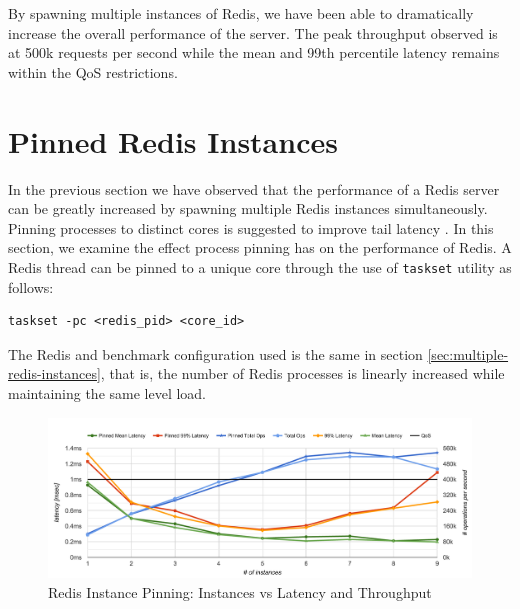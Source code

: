 By spawning multiple instances of Redis, we have been able to dramatically increase the overall performance of the server. The peak throughput observed is at 500k requests per second while the mean and 99th percentile latency remains within the QoS restrictions.


\section{Pinned Redis Instances}

In the previous section we have observed that the performance of a Redis server can be greatly increased by spawning multiple Redis instances simultaneously. Pinning processes to distinct cores is suggested to improve tail latency \cite{leverich2014reconciling}. In this section, we examine the effect process pinning has on the performance of Redis. A Redis thread can be pinned to a unique core through the use of \texttt{taskset} utility as follows:

\begin{lstlisting}
taskset -pc <redis_pid> <core_id>
\end{lstlisting}

The Redis and benchmark configuration used is the same in section \ref{sec:multiple-redis-instances}, that is, the number of Redis processes is linearly increased while maintaining the same level load.

\begin{figure}[h]
    \includegraphics[width=\textwidth]{./res/6_pinned.png}
    \caption{Redis Instance Pinning: Instances vs Latency and Throughput}
    \label{fig:6_pinned.png}
\end{figure}